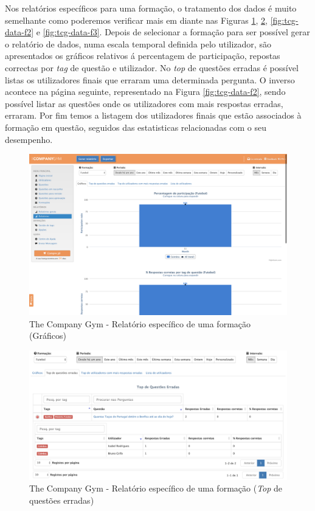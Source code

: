 Nos relatórios específicos para uma formação, o tratamento dos dados é muito semelhante como poderemos verificar mais em diante nas Figuras \ref{fig:tcg-data-f},  \ref{fig:tcg-data-f1}, \ref{fig:tcg-data-f2} e \ref{fig:tcg-data-f3}. Depois de selecionar a formação para ser possível gerar o relatório de dados, numa escala temporal definida pelo utilizador, são apresentados os gráficos relativos á percentagem de participação, repostas correctas por \textit{tag} de questão e utilizador. 
No \textit{top} de questões erradas é possível listas os utilizadores finais que erraram uma determinada pergunta. O inverso acontece na página seguinte, representado na Figura \ref{fig:tcg-data-f2}, sendo possível listar as questões onde os utilizadores com mais respostas erradas, erraram. 
Por fim temos a listagem dos utilizadores finais que estão associados à formação em questão, seguidos das estatisticas relacionadas com o seu desempenho.

\begin{figure}[ht!]
	\begin{center}
		\includegraphics[width=1\textwidth]{img/tcg/tcg-data-f.png}
		\caption{The Company Gym - Relatório específico de uma formação (Gráficos)}
		\label{fig:tcg-data-f}
	\end{center}
\end{figure}

\begin{figure}[ht!]
	\begin{center}
		\includegraphics[width=1\textwidth]{img/tcg/tcg-data-f1.png}
		\caption{The Company Gym - Relatório específico de uma formação (\textit{Top} de questões erradas)}
		\label{fig:tcg-data-f1}
	\end{center}
\end{figure}

